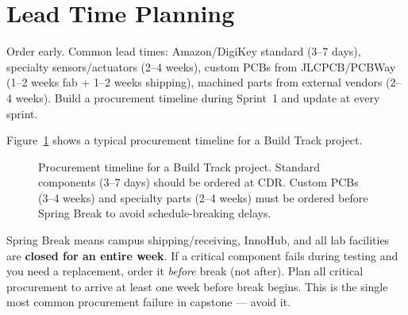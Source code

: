 \section{Lead Time Planning}
Order early. Common lead times: Amazon/DigiKey standard (3--7 days), specialty sensors/actuators (2--4 weeks), custom PCBs from JLCPCB/PCBWay (1--2 weeks fab + 1--2 weeks shipping), machined parts from external vendors (2--4 weeks). Build a procurement timeline during Sprint~1 and update at every sprint.

Figure~\ref{fig:procurement-timeline} shows a typical procurement timeline for a Build Track project.

\begin{figure}[htbp]
\centering
{}
\caption{Procurement timeline for a Build Track project. Standard components (3--7 days) should be ordered at CDR. Custom PCBs (3--4 weeks) and specialty parts (2--4 weeks) must be ordered before Spring Break to avoid schedule-breaking delays.}\label{fig:procurement-timeline}
\end{figure}

\begin{warningbox}
Spring Break means campus shipping/receiving, InnoHub, and all lab facilities are \textbf{closed for an entire week}. If a critical component fails during testing and you need a replacement, order it \emph{before} break (not after). Plan all critical procurement to arrive at least one week before break begins. This is the single most common procurement failure in capstone --- avoid it.
\end{warningbox}

